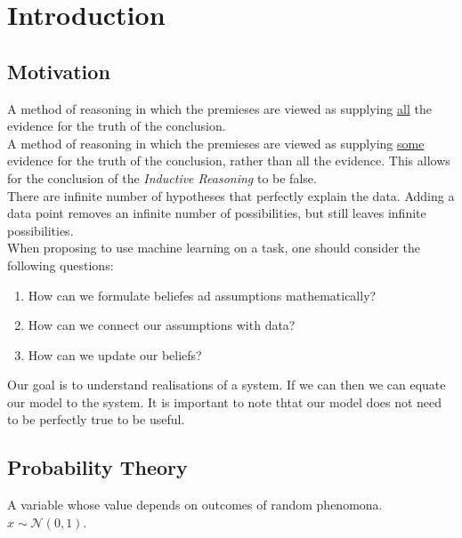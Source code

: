 \documentclass[11pt,a4paper]{article}
\begin{document}
\newpage

\section{Introduction}

\subsection{Motivation}

A method of reasoning in which the premieses are viewed as supplying \underline{all} the evidence for the truth of the conclusion.\\

A method of reasoning in which the premieses are viewed as supplying \underline{some} evidence for the truth of the conclusion, rather than all the evidence. This allows for the conclusion of the \textit{Inductive Reasoning} to be false.\\

There are infinite number of hypotheses that perfectly explain the data. Adding a data point removes an infinite number of possibilities, but still leaves infinite possibilities.\\

When proposing to use machine learning on a task, one should consider the following questions:
\begin{enumerate}[label=\roman*)]
	\item How can we formulate beliefes ad assumptions mathematically?
	\item How can we connect our assumptions with data?
	\item How can we update our beliefs?
\end{enumerate}

Our goal is to understand realisations of a system. If we can then we can equate our model to the system. It is important to note thtat our model does not need to be perfectly true to be useful.

\subsection{Probability Theory}

A variable whose value depends on outcomes of random phenomona.\\
\eg $x\sim\mathcal{N}(0,1)$.\\
\end{document}
